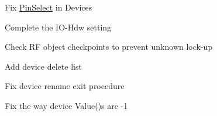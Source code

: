 
\begin{DoxyRefList}
\item[File \mbox{\hyperlink{mi_dev_8h}{mi\+Dev.h}} ]\label{todo__todo000001}%
%

\begin{DoxyItemize}
\item Fix \mbox{\hyperlink{class_pin_select}{Pin\+Select}} in Devices 
\end{DoxyItemize}
\item[File \mbox{\hyperlink{_sys_8h}{Sys.h}} ]\label{todo__todo000002}%
%

\begin{DoxyItemize}
\item Complete the I\+O-\/\+Hdw setting
\item Check \textquotesingle{}RF\textquotesingle{} object checkpoints to prevent unknown lock-\/up
\item Add device delete list
\item Fix device rename exit procedure
\item Fix the way device Value()\textquotesingle{}s are \textquotesingle{}-\/1\textquotesingle{}
\end{DoxyItemize}
\end{DoxyRefList}